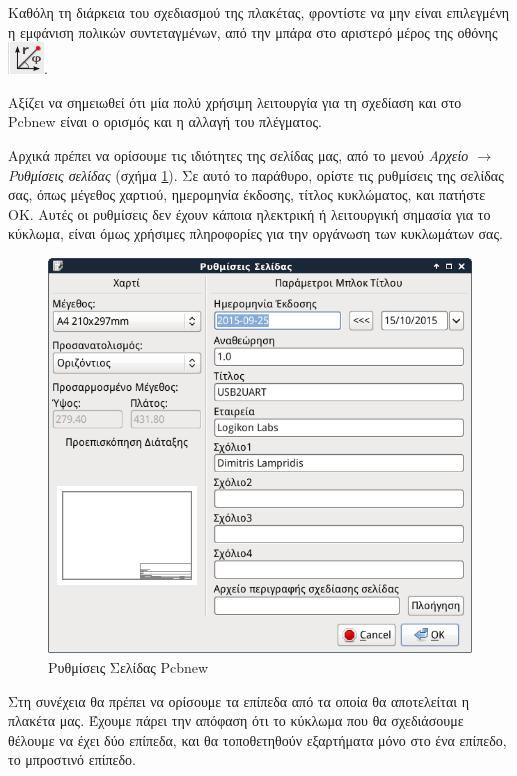 \documentclass[a4paper]{article}
\begin{document}
Καθόλη τη διάρκεια του σχεδιασμού της πλακέτας, φροντίστε να μην είναι επιλεγμένη η εμφάνιση πολικών συντεταγμένων, από την μπάρα στο αριστερό μέρος της οθόνης \includegraphics[scale=.5]{img/pcb-ico-coord.png}.

Αξίζει να σημειωθεί ότι μία πολύ χρήσιμη λειτουργία για τη σχεδίαση και στο Pcbnew είναι ο ορισμός και η αλλαγή του πλέγματος.

Αρχικά πρέπει να ορίσουμε τις ιδιότητες της σελίδας μας, από το μενού \textit{Αρχείο $\rightarrow$ Ρυθμίσεις σελίδας} (σχήμα \ref{fig:pcb-dial-pageset}). Σε αυτό το παράθυρο, ορίστε τις ρυθμίσεις της σελίδας σας, όπως μέγεθος χαρτιού, ημερομηνία έκδοσης, τίτλος κυκλώματος, και πατήστε ΟΚ. Αυτές οι ρυθμίσεις δεν έχουν κάποια ηλεκτρική ή λειτουργική σημασία για το κύκλωμα, είναι όμως χρήσιμες πληροφορίες για την οργάνωση των κυκλωμάτων σας.

\begin{figure}
  \begin{center}
    \includegraphics[width=.5\textwidth]{img/pcb-dial-pageset.png}
    \caption{Ρυθμίσεις Σελίδας Pcbnew}
    \label{fig:pcb-dial-pageset}
  \end{center}
\end{figure}

Στη συνέχεια θα πρέπει να ορίσουμε τα επίπεδα από τα οποία θα αποτελείται η πλακέτα μας. Έχουμε πάρει την απόφαση ότι το κύκλωμα που θα σχεδιάσουμε θέλουμε να έχει δύο επίπεδα, και θα τοποθετηθούν εξαρτήματα μόνο στο ένα επίπεδο, το μπροστινό επίπεδο. 
\end{document}
